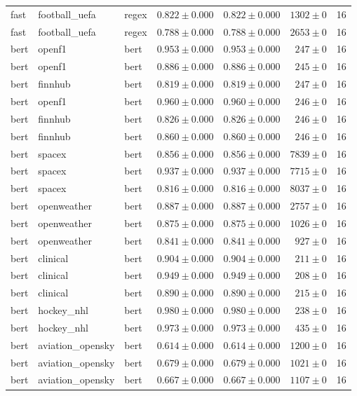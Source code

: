 \begin{table}[htbp]
\begin{tabular}{l l l r r r r}
fast & football\_uefa & regex & $0.822\pm0.000$ & $0.822\pm0.000$ & $1302\pm0$ & 16 \\
fast & football\_uefa & regex & $0.788\pm0.000$ & $0.788\pm0.000$ & $2653\pm0$ & 16 \\
bert & openf1 & bert & $0.953\pm0.000$ & $0.953\pm0.000$ & $247\pm0$ & 16 \\
bert & openf1 & bert & $0.886\pm0.000$ & $0.886\pm0.000$ & $245\pm0$ & 16 \\
bert & finnhub & bert & $0.819\pm0.000$ & $0.819\pm0.000$ & $247\pm0$ & 16 \\
bert & openf1 & bert & $0.960\pm0.000$ & $0.960\pm0.000$ & $246\pm0$ & 16 \\
bert & finnhub & bert & $0.826\pm0.000$ & $0.826\pm0.000$ & $246\pm0$ & 16 \\
bert & finnhub & bert & $0.860\pm0.000$ & $0.860\pm0.000$ & $246\pm0$ & 16 \\
bert & spacex & bert & $0.856\pm0.000$ & $0.856\pm0.000$ & $7839\pm0$ & 16 \\
bert & spacex & bert & $0.937\pm0.000$ & $0.937\pm0.000$ & $7715\pm0$ & 16 \\
bert & spacex & bert & $0.816\pm0.000$ & $0.816\pm0.000$ & $8037\pm0$ & 16 \\
bert & openweather & bert & $0.887\pm0.000$ & $0.887\pm0.000$ & $2757\pm0$ & 16 \\
bert & openweather & bert & $0.875\pm0.000$ & $0.875\pm0.000$ & $1026\pm0$ & 16 \\
bert & openweather & bert & $0.841\pm0.000$ & $0.841\pm0.000$ & $927\pm0$ & 16 \\
bert & clinical & bert & $0.904\pm0.000$ & $0.904\pm0.000$ & $211\pm0$ & 16 \\
bert & clinical & bert & $0.949\pm0.000$ & $0.949\pm0.000$ & $208\pm0$ & 16 \\
bert & clinical & bert & $0.890\pm0.000$ & $0.890\pm0.000$ & $215\pm0$ & 16 \\
bert & hockey\_nhl & bert & $0.980\pm0.000$ & $0.980\pm0.000$ & $238\pm0$ & 16 \\
bert & hockey\_nhl & bert & $0.973\pm0.000$ & $0.973\pm0.000$ & $435\pm0$ & 16 \\
bert & aviation\_opensky & bert & $0.614\pm0.000$ & $0.614\pm0.000$ & $1200\pm0$ & 16 \\
bert & aviation\_opensky & bert & $0.679\pm0.000$ & $0.679\pm0.000$ & $1021\pm0$ & 16 \\
bert & aviation\_opensky & bert & $0.667\pm0.000$ & $0.667\pm0.000$ & $1107\pm0$ & 16 \\

\end{tabular}
\end{table}
